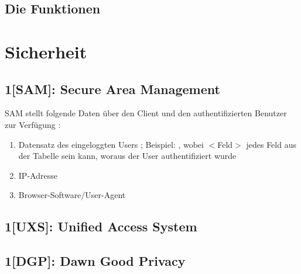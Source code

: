 

\newpage

\section{Die Funktionen}
\label{Funktionen}


\chapter{Sicherheit}

\newpage

\section{1{[}SAM{]}: Secure Area Management}
\label{SAM}

SAM stellt folgende Daten \"uber den Client und den authentifizierten
Benutzer zur Verf\"ugung :

\begin{enumerate}
\item Datensatz des eingeloggten Users ;
  Beispiel: , wobei $<$Feld$>$ jedes Feld
    aus der Tabelle sein kann, woraus der User authentifiziert wurde
\item IP-Adresse
\item Browser-Software/User-Agent
\end{enumerate}

\newpage

\section{1{[}UXS{]}: Unified Access System}
\label{UXS}
\label{UXSI}

\newpage

\section{1{[}DGP{]}: Dawn Good Privacy}

